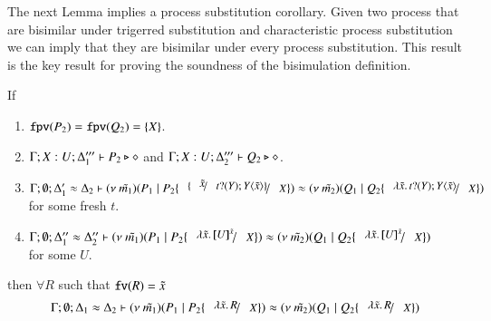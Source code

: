 \begin{comment}
	\noi {\bf Induction step:}

	\noi - Case: $Q \Par R \by{\bactout{s}{(x) P}} Q' \Par R$ and
	\[
		\Gamma; \emptyset; \Delta_1 \proves Q \Par R \hastype \Proc
	\]
	\noi Type rule $\trule{Par}$ implies
	\begin{eqnarray}
		\Gamma; \emptyset; \Delta_1' &\proves& Q \hastype \Proc\\
		\Gamma; \emptyset; \Delta_1'' &\proves& R \hastype \Proc \label{lem:aux3}
	\end{eqnarray}
	\noi From the induction hypothesis we get that 
	\begin{eqnarray*}
		\Gamma; \emptyset; \Delta_2' \proves Q' \Par P \hastype \Proc
	\end{eqnarray*}
	we apply rule $\trule{Par}$ to the latter judgement and judgement~\ref{lem:aux3} to get
	\begin{eqnarray*}
		\Gamma; \emptyset; \Delta_2' \cup \Delta'' \proves Q' \Par R \Par P \hastype \Proc
	\end{eqnarray*}

	The rest of the cases enjoy similar argumentation.
\end{proof}

\end{comment}


The next Lemma implies a process substitution corollary.
Given two process that are bisimilar under trigerred substitution
and characteristic process substitution we can imply that they are
bisimilar under every process substitution. This result is
the key result for proving the soundness of the bisimulation
definition.

\begin{lemma}\rm
	\label{lem:subst_equiv}
	If 
%
	\begin{enumerate}
		\item	$\mathtt{fpv}(P_2) = \mathtt{fpv}(Q_2) = \{X\}$.
		\item	$\Gamma; X: U; \Delta_1''' \vdash P_2 \triangleright \diamond$ and $\Gamma; X: U; \Delta_2''' \vdash Q_2 \triangleright \diamond$.
		\item	$\horel{\Gamma}{\Delta_1'}{\newsp{\tilde{m_1}}{P_1 \Par P_2 \subst{\subst{\tilde{x}}{\binp{t}{Y} \appl{Y}{\tilde{x}}}}{X}}}{\wb}{\Delta_2}{\newsp{\tilde{m_2}}{Q_1 \Par Q_2 \subst{\abs{\tilde{x}}{\binp{t}{Y} \appl{Y}{\tilde{x}}}}{X}}}$ \\
			for some fresh $t$.

		\item	$\horel{\Gamma}{\Delta_1''}{\newsp{\tilde{m_1}}{P_1 \Par P_2 \subst{\abs{\tilde{x}}{\map{U}^{\tilde{x}}}}{X}}}{\wb}{\Delta_2''}{\newsp{\tilde{m_2}}{Q_1 \Par Q_2 \subst{\abs{\tilde{x}}{\map{U}^{\tilde{x}}}}{X}}}$\\
			for some $U$.
	\end{enumerate}
%
	then $\forall R$ such that $\mathtt{fv}(R) = \tilde{x}$
\[
	\horel{\Gamma}{\Delta_1}{\newsp{\tilde{m_1}}{P_1 \Par P_2 \subst{\abs{\tilde{x}}{R}}{X}}}
	{\wb}
	{\Delta_2}{\newsp{\tilde{m_2}}{Q_1 \Par Q_2 \subst{\abs{\tilde{x}}{R}}{X}}}
\]
\end{lemma}

